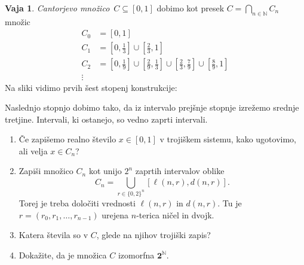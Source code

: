 \documentclass{article}
\newcommand{\two}{\mathbf{2}}
\newcommand{\NN}{\mathbb{N}}
\theoremstyle{definition}
\newtheorem{vaja}{Vaja}
\begin{document}
\begin{vaja}
  \emph{Cantorjevo množico}~$C \subseteq [0,1]$ dobimo kot presek $C = \bigcap_{n \in \NN} C_n$
  množic
  \begin{align*}
    C_0 &= \textstyle
          [0,1] \\
    C_1 &= \textstyle
          [0,\frac{1}{3}] \cup [\frac{2}{3}, 1] \\
    C_2 &= \textstyle
          [0,\frac{1}{9}] \cup [\frac{2}{9}, \frac{1}{3}] \cup
          [\frac{2}{3},\frac{7}{9}] \cup [\frac{8}{9}, 1] \\
    \vdots &
  \end{align*}
  Na sliki vidimo prvih šest stopenj konstrukcije:
  \begin{center}
  \end{center}
  Naslednjo stopnjo dobimo tako, da iz intervalo prejšnje stopnje izrežemo srednje
  tretjine. Intervali, ki ostanejo, so vedno zaprti intervali.
  \begin{enumerate}
  \item Če zapišemo realno število $x \in [0,1]$ v trojiškem sistemu, kako ugotovimo, ali
    velja $x \in C_n$?

  \item Zapiši množico $C_n$ kot unijo $2^n$ zaprtih intervalov oblike
    \begin{equation*}
      C_n = \bigcup_{r \in \{0,2\}^n} [\ell(n, r), d(n, r)].
    \end{equation*}
    Torej je treba določiti vrednosti $\ell(n, r)$ in $d(n, r)$. Tu je
    $r = (r_0, r_1, \ldots, r_{n-1})$ urejena $n$-terica ničel in dvojk.

  \item Katera števila so v $C$, glede na njihov trojiški zapis?

  \item Dokažite, da je množica $C$ izomorfna $\two^\NN$.
  \end{enumerate}
\end{vaja}
\end{document}
